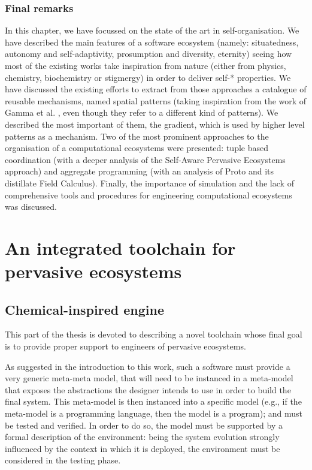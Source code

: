 \documentclass[12pt,a4paper,twoside,openright]{book}
\begin{document}
\section{Final remarks}

In this chapter, we have focussed on the state of the art in self-organisation.
%
We have described the main features of a software ecosystem (namely: situatedness, autonomy and self-adaptivity, prosumption and diversity, eternity) seeing how most of the existing works take inspiration from nature (either from physics, chemistry, biochemistry or stigmergy) in order to deliver self-* properties.
%
We have discussed the existing efforts to extract from those approaches a catalogue of reusable mechanisms, named spatial patterns (taking inspiration from the work of Gamma et al. \cite{Gamma1995}, even though they refer to a different kind of patterns).
%
We described the most important of them, the gradient, which is used by higher level patterns as a mechanism.
%
Two of the most prominent approaches to the organisation of a computational ecosystems were presented: tuple based coordination (with a deeper analysis of the Self-Aware Pervasive Ecosystems approach) and aggregate programming (with an analysis of Proto and its distillate Field Calculus).
%
Finally, the importance of simulation and the lack of comprehensive tools and procedures for engineering computational ecosystems was discussed.



\part{An integrated toolchain for pervasive ecosystems}
\label{alchemist-part}
\chapter{Chemical-inspired engine}
\label{chemical-engine}
This part of the thesis is devoted to describing a novel toolchain whose final goal is to provide proper support to engineers of pervasive ecosystems.

As suggested in the introduction to this work, such a software must provide a very generic meta-meta model, that will need to be instanced in a meta-model that exposes the abstractions the designer intends to use in order to build the final system.
%
This meta-model is then instanced into a specific model (e.g., if the meta-model is a programming language, then the model is a program); and must be tested and verified.
%
In order to do so, the model must be supported by a formal description of the environment: being the system evolution strongly influenced by the context in which it is deployed, the environment must be considered in the testing phase.
\end{document}

